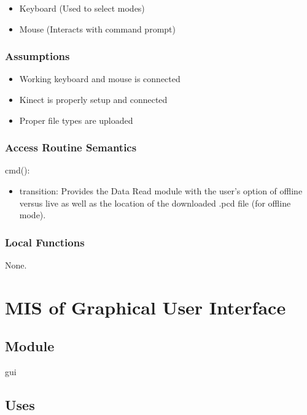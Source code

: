 \documentclass[12pt, titlepage]{article}
\begin{document}
\begin{itemize}
  \item Keyboard (Used to select modes)
  \item Mouse (Interacts with command prompt)
\end{itemize}

\subsubsection{Assumptions}

\begin{itemize}
  \item Working keyboard and mouse is connected
  \item Kinect is properly setup and connected
  \item Proper file types are uploaded
\end{itemize}

\subsubsection{Access Routine Semantics}

\noindent cmd():
\begin{itemize}
\item transition: Provides the Data Read module with the user's option of offline versus live as well as the location of the downloaded .pcd file (for offline mode).
\end{itemize}

\subsubsection{Local Functions}

None.

\newpage

\section{MIS of Graphical User Interface} \label{ModuleGUI} 

\subsection{Module}

gui

\subsection{Uses}
\end{document}
